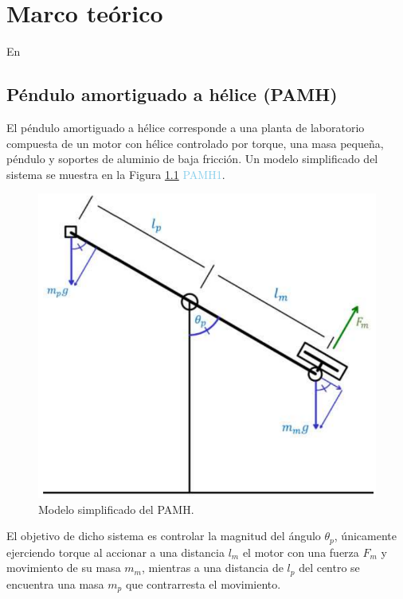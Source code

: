 \chapter{Marco teórico}
\label{ch:marco}

En

\section{Péndulo amortiguado a hélice (PAMH)}

El péndulo amortiguado a hélice corresponde a una planta de laboratorio compuesta de un motor con hélice controlado por torque, una masa pequeña, péndulo y soportes de aluminio de baja fricción. Un modelo simplificado del sistema se muestra en la Figura \ref{fig:modpen} \textcolor{SkyBlue}{PAMH1}.

\begin{figure}[h]
	\centering
	\includegraphics[scale=0.3]{fig/new/ModeloPendulo.png}
	\caption{Modelo simplificado del PAMH.}
	\label{fig:modpen}
\end{figure}

El objetivo de dicho sistema es controlar la magnitud del ángulo $\theta_p$, únicamente ejerciendo torque al accionar a una distancia $l_m$ el motor con una fuerza $F_m$ y movimiento de su masa $m_m$, mientras a una distancia de $l_p$ del centro se encuentra una masa $m_p$ que contrarresta el movimiento.

